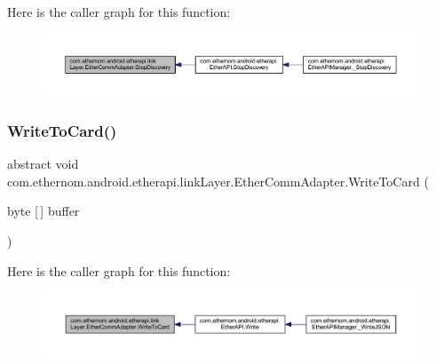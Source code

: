 Here is the caller graph for this function\+:\nopagebreak
\begin{figure}[H]
\begin{center}
\leavevmode
\includegraphics[width=350pt]{classcom_1_1ethernom_1_1android_1_1etherapi_1_1link_layer_1_1_ether_comm_adapter_acca97182df90976a030684b62c871131_icgraph}
\end{center}
\end{figure}
\mbox{\label{classcom_1_1ethernom_1_1android_1_1etherapi_1_1link_layer_1_1_ether_comm_adapter_accd54674d191e15ebf08a7c8e7a8d8e9}} 
\subsubsection{\texorpdfstring{Write\+To\+Card()}{WriteToCard()}}
{\footnotesize\ttfamily abstract void com.\+ethernom.\+android.\+etherapi.\+link\+Layer.\+Ether\+Comm\+Adapter.\+Write\+To\+Card (\begin{DoxyParamCaption}\item[{byte \mbox{[}$\,$\mbox{]}}]{buffer }\end{DoxyParamCaption})\hspace{0.3cm}{\ttfamily [abstract]}}

Here is the caller graph for this function\+:\nopagebreak
\begin{figure}[H]
\begin{center}
\leavevmode
\includegraphics[width=350pt]{classcom_1_1ethernom_1_1android_1_1etherapi_1_1link_layer_1_1_ether_comm_adapter_accd54674d191e15ebf08a7c8e7a8d8e9_icgraph}
\end{center}
\end{figure}


